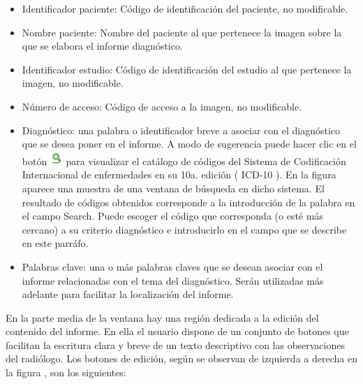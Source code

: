 \documentclass{plantilla-manual-usuario}
\begin{document}
\begin{itemize}
\item Identificador paciente: Código de identificación del paciente, no modificable.
\item Nombre paciente: Nombre del paciente al que pertenece la imagen sobre la que se elabora el informe diagnóstico.
\item Identificador estudio: Código de identificación del estudio al que pertenece la imagen, no modificable.
\item Número de acceso: Código de acceso a la imagen, no modificable.
\item Diagnóstico: una palabra o identificador breve a asociar con el diagnóstico que se desea poner en el informe. A modo de sugerencia puede hacer clic en el botón \includegraphics[scale=0.9]{images/buscar-ICD-10.png} para visualizar el catálogo de códigos del Sistema de Codificación Internacional de enfermedades en su 10a. edición ( ICD-10 ). En la figura  aparece una muestra de una ventana de búsqueda en dicho sistema. El resultado de códigos obtenidos corresponde a la introducción de la palabra  en el campo Search. Puede escoger el código que corresponda (o esté más cercano) a su criterio diagnóstico e introducirlo en el campo que se describe en este parráfo.
\item Palabras clave: una o más palabras claves que se desean asociar con el informe relacionadas con el tema del diagnóstico. Serán utilizadas más adelante para facilitar la localización del informe. 
\end{itemize}


En la parte media de la ventana hay una región dedicada a la edición del contenido del informe. En ella el usuario dispone de un conjunto de botones que facilitan la escritura clara y breve de un texto descriptivo con las observaciones del radiólogo. Los botones de edición, según se observan de izquierda a derecha en la figura , son los siguientes:

\end{document}
